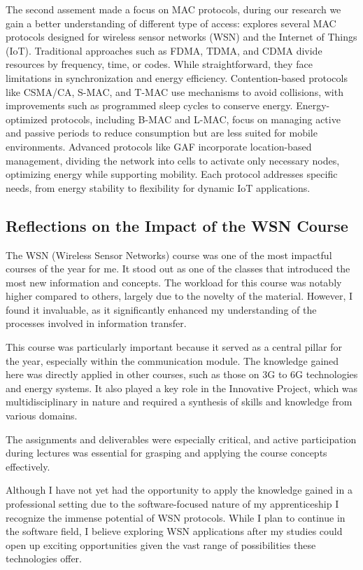 The second assement made a focus on MAC protocols, during our research we gain a better understanding of different type of access: 
explores several MAC protocols designed for wireless sensor networks (WSN) and the Internet of Things (IoT). Traditional approaches such as FDMA, TDMA, and CDMA divide resources by frequency, time, or codes. While straightforward, they face limitations in synchronization and energy efficiency. 
Contention-based protocols like CSMA/CA, S-MAC, and T-MAC use mechanisms to avoid collisions, with improvements such as programmed sleep cycles to conserve energy. Energy-optimized protocols, including B-MAC and L-MAC, focus on managing active and passive periods to reduce consumption but are less suited for mobile environments. 
Advanced protocols like GAF incorporate location-based management, dividing the network into cells to activate only necessary nodes, optimizing energy while supporting mobility. Each protocol addresses specific needs, from energy stability to flexibility for dynamic IoT applications.


\subsection{Reflections on the Impact of the WSN Course}

The WSN (Wireless Sensor Networks) course was one of the most impactful courses of the year for me. It stood out as one of the classes that introduced the most new information and concepts. The workload for this course was notably higher compared to others, largely due to the novelty of the material. However, I found it invaluable, as it significantly enhanced my understanding of the processes involved in information transfer.

This course was particularly important because it served as a central pillar for the year, especially within the communication module. The knowledge gained here was directly applied in other courses, such as those on 3G to 6G technologies and energy systems. It also played a key role in the Innovative Project, which was multidisciplinary in nature and required a synthesis of skills and knowledge from various domains.

The assignments and deliverables were especially critical, and active participation during lectures was essential for grasping and applying the course concepts effectively.

Although I have not yet had the opportunity to apply the knowledge gained in a professional setting due to the software-focused nature of my apprenticeship I recognize the immense potential of WSN protocols. While I plan to continue in the software field, I believe exploring WSN applications after my studies could open up exciting opportunities given the vast range of possibilities these technologies offer.

